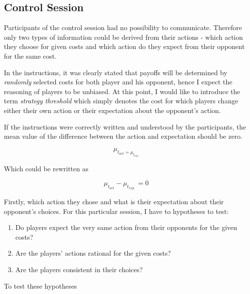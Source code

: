 \documentclass[
  digital, %
  twoside, %
  lof,     %
  lot,     %
]{fithesis4}
\begin{document}
\section{Control Session}
Participants of the control session had no possibility to communicate. Therefore only two types of information could be derived from their actions - which action they choose for given costs and which action do they expect from their opponent for the same cost. 
\par
In the instructions, it was clearly stated that payoffs will be determined by \emph{randomly} selected costs for both player and his opponent, hence I expect the reasoning of players to be unbiased. At this point, I would like to introduce the term \emph{strategy threshold} which simply denotes the cost for which players change either their own action or their expectation about the opponent's action.
\par
If the instructions were correctly written and understood by the participants, the mean value of the difference between the action and expectation should be zero.

\begin{equation}
\mu_{t_{act} = \mu_{t_{exp}}}
\end{equation}
 
 Which could be rewritten as 

\begin{equation}
\mu_{t_{act}} - \mu_{t_{exp}}\ = 0
\end{equation}


\par
Firstly, which action they chose and what is their expectation about their opponent's choices. For this particular session, I have to hypotheses to test:
\begin{enumerate}
    \item Do players expect the very same action from their opponents for the given costs?
    \item Are the players' actions rational for the given costs?
    \item Are the players consistent in their choices?
\end{enumerate}

To test these hypotheses

\chapter{}
\end{document}
